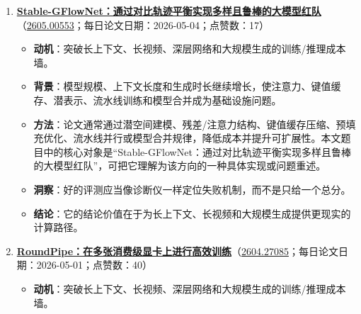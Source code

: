 \begin{enumerate}[leftmargin=1.5em]
  \begin{itemize}[leftmargin=1.5em]
    \item \textbf{动机}：突破长上下文、长视频、深层网络和大规模生成的训练/推理成本墙。
    \item \textbf{背景}：模型规模、上下文长度和生成时长继续增长，使注意力、键值缓存、潜表示、流水线训练和模型合并成为基础设施问题。
    \item \textbf{方法}：论文通常通过潜空间建模、残差/注意力结构、键值缓存压缩、预填充优化、流水线并行或模型合并规律，降低成本并提升可扩展性。本文题目中的核心对象是“让视觉 Transformer 说话：生成式语言—图像预训练”，可把它理解为该方向的一种具体实现或问题重述。
    \item \textbf{洞察}：生成模型的核心竞争正从单帧质量转向可控性、一致性和工作流可用性。
    \item \textbf{结论}：它的结论价值在于为长上下文、长视频和大规模生成提供更现实的计算路径。
  \end{itemize}
  \item \textbf{\href{https://huggingface.co/papers/2605.00553}{Stable-GFlowNet：通过对比轨迹平衡实现多样且鲁棒的大模型红队}}（\href{https://arxiv.org/abs/2605.00553}{2605.00553}；每日论文日期：2026-05-04；点赞数：17）
  \begin{itemize}[leftmargin=1.5em]
    \item \textbf{动机}：突破长上下文、长视频、深层网络和大规模生成的训练/推理成本墙。
    \item \textbf{背景}：模型规模、上下文长度和生成时长继续增长，使注意力、键值缓存、潜表示、流水线训练和模型合并成为基础设施问题。
    \item \textbf{方法}：论文通常通过潜空间建模、残差/注意力结构、键值缓存压缩、预填充优化、流水线并行或模型合并规律，降低成本并提升可扩展性。本文题目中的核心对象是“Stable-GFlowNet：通过对比轨迹平衡实现多样且鲁棒的大模型红队”，可把它理解为该方向的一种具体实现或问题重述。
    \item \textbf{洞察}：好的评测应当像诊断仪一样定位失败机制，而不是只给一个总分。
    \item \textbf{结论}：它的结论价值在于为长上下文、长视频和大规模生成提供更现实的计算路径。
  \end{itemize}
  \item \textbf{\href{https://huggingface.co/papers/2604.27085}{RoundPipe：在多张消费级显卡上进行高效训练}}（\href{https://arxiv.org/abs/2604.27085}{2604.27085}；每日论文日期：2026-05-01；点赞数：40）
  \begin{itemize}[leftmargin=1.5em]
    \item \textbf{动机}：突破长上下文、长视频、深层网络和大规模生成的训练/推理成本墙。

\end{itemize}
\end{enumerate}
